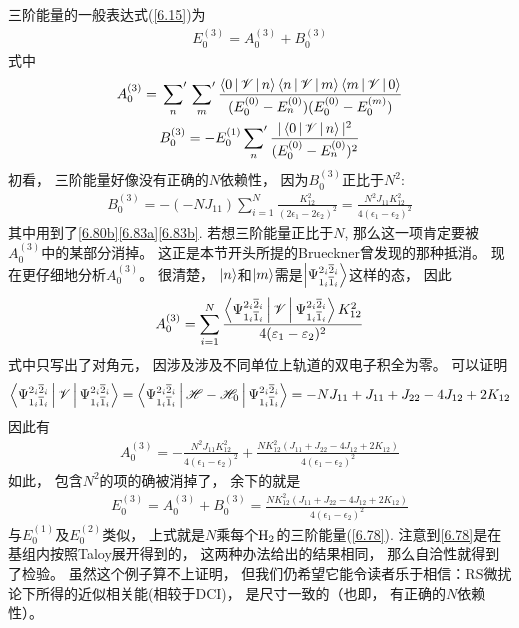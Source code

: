 三阶能量的一般表达式(\autoref{6.15})为
\begin{align}
E_0^{(3)} = A_0^{(3)} + B_{0}^{(3)}
\end{align}
式中
\begin{gather}
A_0^{(3)} = \sideset{}{'}\sum_n \sideset{}{'}\sum_m \frac{\Braket{0|\mathscr{V}|n}\Braket{n|\mathscr{V}|m}\Braket{m|\mathscr{V}|0}}{(E_0^{(0)} - E_n^{(0)}) (E_0^{(0)} - E_0^{(m)}) }\\
B_0^{(3)} = -E_0^{(1)}\sideset{}{'}{\sum}_n\frac{|\Braket{0|\mathscr{V}|n}|^2}{(E_0^{(0)} - E_n^{(0)})^2}
\end{gather}
初看，
三阶能量好像没有正确的$N$依赖性，
因为$B_0^{(3)}$正比于$N^2$:
\begin{align}
B_0^{(3)} = -(-NJ_{11}) \sum_{i=1}^{N} \frac{K_{12}^2}{(2\epsilon_1 - 2\epsilon_2)^2} = \frac{N^2J_{11}K_{12}^2}{4(\epsilon_1-\epsilon_2)^2}
\end{align}
其中用到了\autoref{6.80b}\autoref{6.83a}\autoref{6.83b}. 
若想三阶能量正比于$N$, 
那么这一项肯定要被$A_0^{(3)}$中的某部分消掉。
这正是本节开头所提的Brueckner曾发现的那种抵消。
现在更仔细地分析$A_0^{(3)}$。 
很清楚，
$\Ket{n}$和$\Ket{m}$需是$\Ket{\Psi_{1_i\overline{1}_i}^{2_i\overline{2}_i}}$这样的态，
因此
\begin{align}
A_0^{(3)} = \sum_{i=1}^{N} \frac{\Braket{\Psi_{1_i\overline{1}_i}^{2_i\overline{2}_i}|\mathscr{V}|\Psi_{1_i\overline{1}_i}^{2_i\overline{2}_i}}K_{12}^2}{4(\varepsilon_1 - \varepsilon_2)^2}
\end{align}
式中只写出了对角元，
因涉及涉及不同单位上轨道的双电子积全为零。
可以证明
\begin{align}\Braket{\Psi_{1_i\overline{1}_i}^{2_i\overline{2}_i}|\mathscr{V}|\Psi_{1_i\overline{1}_i}^{2_i\overline{2}_i}} = \Braket{\Psi_{1_i\overline{1}_i}^{2_i\overline{2}_i}|\mathscr{H}-\mathscr{H}_0|\Psi_{1_i\overline{1}_i}^{2_i\overline{2}_i}}=-NJ_{11} + J_{11} + J_{22} - 4J_{12} + 2K_{12}
\label{6.90}
\end{align}
因此有
\begin{align}
A_0^{(3)} = - \frac{N^2J_{11}K_{12}^2}{4(\epsilon_1 - \epsilon_2)^2} + \frac{NK_{12}^2(J_{11} + J_{22} - 4J_{12} + 2K_{12})}{4(\epsilon_1 - \epsilon_2)^2}
\end{align}
如此，
包含$N^2$的项的确被消掉了，
余下的就是
\begin{align}
E_0^{(3)} = A_0^{(3)} + B_0^{(3)} = \frac{NK_{12}^2(J_{11} + J_{22} - 4J_{12} + 2K_{12})}{4(\epsilon_1 - \epsilon_2)^2}
\label{eq:6.92}
\end{align}
与$E_0^{(1)}$及$E_0^{(2)}$类似，
上式就是$N$乘每个$\mathrm{H}_2$的三阶能量(\autoref{6.78}). 
注意到\autoref{6.78}是在基组内按照Taloy展开得到的，
这两种办法给出的结果相同，
那么自洽性就得到了检验。
虽然这个例子算不上证明，
但我们仍希望它能令读者乐于相信：RS微扰论下所得的近似相关能(相较于DCI)，
是尺寸一致的（也即，
有正确的$N$依赖性）。

